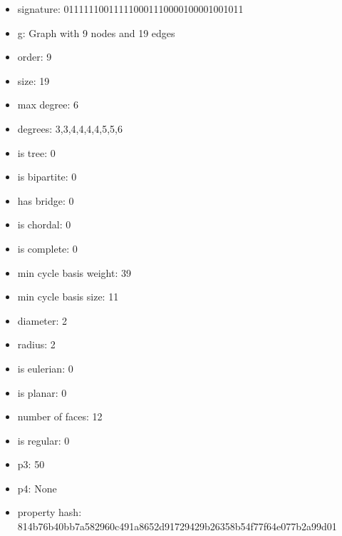 \newpage
\begin{figure}
\end{figure}
\begin{itemize}
\item signature: 011111100111110001110000100001001011
\item g: Graph with 9 nodes and 19 edges
\item order: 9
\item size: 19
\item max degree: 6
\item degrees: 3,3,4,4,4,4,5,5,6
\item is tree: 0
\item is bipartite: 0
\item has bridge: 0
\item is chordal: 0
\item is complete: 0
\item min cycle basis weight: 39
\item min cycle basis size: 11
\item diameter: 2
\item radius: 2
\item is eulerian: 0
\item is planar: 0
\item number of faces: 12
\item is regular: 0
\item p3: 50
\item p4: None
\item property hash: 814b76b40bb7a582960c491a8652d91729429b26358b54f77f64e077b2a99d01
\end{itemize}
